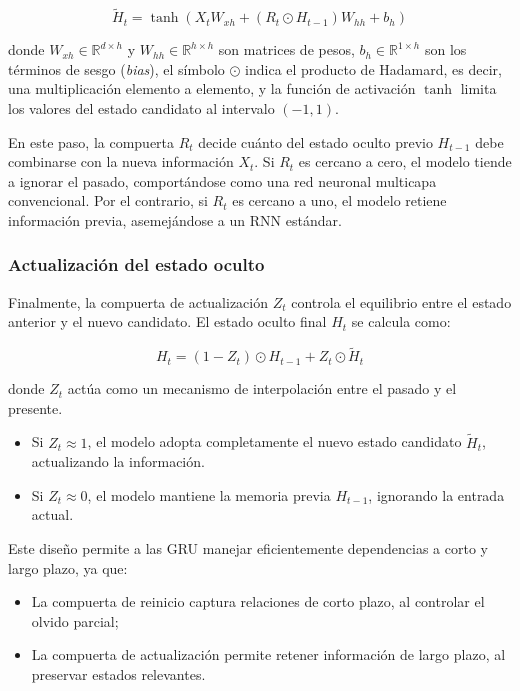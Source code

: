 \begin{equation}
\tilde{H}_t = \tanh(X_t W_{xh} + (R_t \odot H_{t-1}) W_{hh} + b_h)
\end{equation}

\justify
donde $W_{xh} \in \mathbb{R}^{d \times h}$ y $W_{hh} \in \mathbb{R}^{h \times h}$ son matrices de pesos, $b_h \in \mathbb{R}^{1 \times h}$ son los términos de sesgo (\textit{bias}), el símbolo $\odot$ indica el producto de Hadamard, es decir, una multiplicación elemento a elemento, y la función de activación $\tanh$ limita los valores del estado candidato al intervalo $(-1,1)$.

\justify
En este paso, la compuerta $R_t$ decide cuánto del estado oculto previo $H_{t-1}$ debe combinarse con la nueva información $X_t$.
Si $R_t$ es cercano a cero, el modelo tiende a ignorar el pasado, comportándose como una red neuronal multicapa convencional.
Por el contrario, si $R_t$ es cercano a uno, el modelo retiene información previa, asemejándose a un RNN estándar.

\subsubsection{Actualización del estado oculto}
\justify
Finalmente, la compuerta de actualización $Z_t$ controla el equilibrio entre el estado anterior y el nuevo candidato.
\justify
El estado oculto final $H_t$ se calcula como:

\begin{equation}
H_t = (1 - Z_t) \odot H_{t-1} + Z_t \odot \tilde{H}_t
\end{equation}  

\justify
donde $Z_t$ actúa como un mecanismo de interpolación entre el pasado y el presente.

\begin{itemize}
\item Si $Z_t \approx 1$, el modelo adopta completamente el nuevo estado candidato $\tilde{H}_t$, actualizando la información.
\item Si $Z_t \approx 0$, el modelo mantiene la memoria previa $H_{t-1}$, ignorando la entrada actual.
\end{itemize}

\justify
Este diseño permite a las GRU manejar eficientemente dependencias a corto y largo plazo, ya que:

\begin{itemize}
\item La compuerta de reinicio captura relaciones de corto plazo, al controlar el olvido parcial;
\item La compuerta de actualización permite retener información de largo plazo, al preservar estados relevantes.
\end{itemize}

